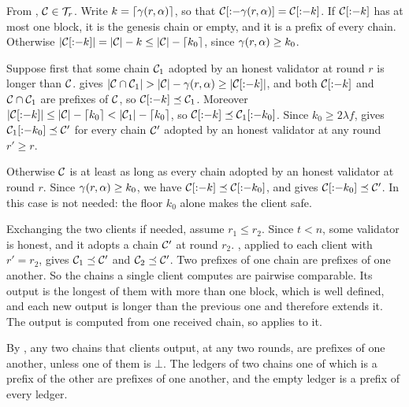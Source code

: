\begin{proofof}{}
    From , $\mathcal{C}\in\mathcal{T}_r$. Write $k=\lceil\gamma(r,\alpha)\rceil$,
    so that $\mathcal{C}[{:}{-}\gamma(r,\alpha)]=\mathcal{C}[{:}{-}k]$. If $\mathcal{C}[{:}{-}k]$ has
    at most one block, it is the genesis chain or empty, and it is a prefix of
    every chain. Otherwise
    $\lvert \mathcal{C}[{:}{-}k]\rvert=\lvert \mathcal{C}\rvert-k\le\lvert \mathcal{C}\rvert-\lceil k_0\rceil$, since
    $\gamma(r,\alpha)\ge k_0$.

    Suppose first that some chain $\mathcal{C}_1$ adopted by an honest validator at
    round $r$ is longer than $\mathcal{C}$.  gives
    $\lvert \mathcal{C}\cap\mathcal{C}_1\rvert>\lvert \mathcal{C}\rvert-\gamma(r,\alpha)\ge\lvert \mathcal{C}[{:}{-}k]\rvert$, and
    both $\mathcal{C}[{:}{-}k]$ and $\mathcal{C}\cap\mathcal{C}_1$ are prefixes of $\mathcal{C}$, so
    $\mathcal{C}[{:}{-}k]\preceq\mathcal{C}_1$. Moreover
    $\lvert \mathcal{C}[{:}{-}k]\rvert\le\lvert \mathcal{C}\rvert-\lceil k_0\rceil<\lvert \mathcal{C}_1\rvert-\lceil k_0\rceil$,
    so $\mathcal{C}[{:}{-}k]\preceq\mathcal{C}_1[{:}{-}k_0]$. Since $k_0\ge2\lambda f$,
     gives $\mathcal{C}_1[{:}{-}k_0]\preceq\mathcal{C}'$ for every
    chain $\mathcal{C}'$ adopted by an honest validator at any round $r'\ge r$.

    Otherwise $\mathcal{C}$ is at least as long as every chain adopted by an honest
    validator at round $r$. Since $\gamma(r,\alpha)\ge k_0$, we have
    $\mathcal{C}[{:}{-}k]\preceq\mathcal{C}[{:}{-}k_0]$, and  gives
    $\mathcal{C}[{:}{-}k_0]\preceq\mathcal{C}'$. In this case  is not
    needed: the floor $k_0$ alone makes the client safe.
\end{proofof}

\begin{proofof}{}
    Exchanging the two clients if needed, assume $r_1\le r_2$. Since $t<n$, some
    validator is honest, and it adopts a chain $\mathcal{C}'$ at round $r_2$.
    , applied to each client with $r'=r_2$, gives
    $\mathcal{C}_1\preceq\mathcal{C}'$ and $\mathcal{C}_2\preceq\mathcal{C}'$. Two prefixes of one chain are
    prefixes of one another. So the chains a single client computes are pairwise
    comparable. Its output is the longest of them with more than one block, which
    is well defined, and each new output is longer than the previous one and
    therefore extends it. The output is computed from one received chain, so
     applies to it.
\end{proofof}

\begin{proofof}{}
    By , any two chains that clients output, at any two
    rounds, are prefixes of one another, unless one of them is $\bot$. The
    ledgers of two chains one of which is a prefix of the other are prefixes of
    one another, and the empty ledger is a prefix of every ledger.
\end{proofof}


